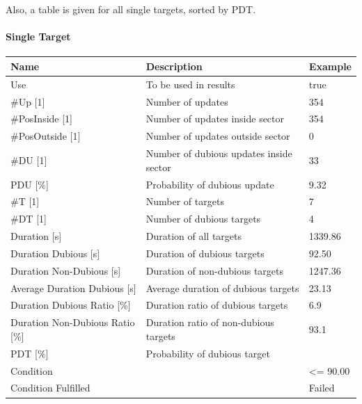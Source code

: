 Also, a table is given for all single targets, sorted by PDT.

\paragraph{Single Target}

\begin{center}
 \begin{table}[H]
  \begin{tabularx}{\textwidth}{ | l | X |  l | }
    \hline
    \textbf{Name} & \textbf{Description} & \textbf{Example} \\ \hline
    Use & To be used in results & true \\ \hline
    \#Up [1] & Number of updates & 354 \\ \hline
    \#PosInside [1] & Number of updates inside sector & 354 \\ \hline
    \#PosOutside [1] & Number of updates outside sector & 0 \\ \hline
    \#DU [1] & Number of dubious updates inside sector & 33 \\ \hline
    PDU [\%] & Probability of dubious update & 9.32 \\ \hline
    \#T [1] & Number of targets & 7 \\ \hline
    \#DT [1] & Number of dubious targets & 4 \\ \hline
    Duration [s] & Duration of all targets & 1339.86 \\ \hline
    Duration Dubious [s] & Duration of dubious targets & 92.50 \\ \hline
    Duration Non-Dubious [s] & Duration of non-dubious targets & 1247.36 \\ \hline
    Average Duration Dubious [s] & Average duration of dubious targets & 23.13 \\ \hline
    Duration Dubious Ratio [\%] & Duration ratio of dubious targets & 6.9 \\ \hline
    Duration Non-Dubious Ratio [\%] & Duration ratio of non-dubious targets & 93.1 \\ \hline
    PDT [\%] & Probability of dubious target &  \\ \hline
    Condition &  & <= 90.00 \\ \hline
    Condition Fulfilled &  & Failed \\ \hline
\end{tabularx}
\end{table}
\end{center}

